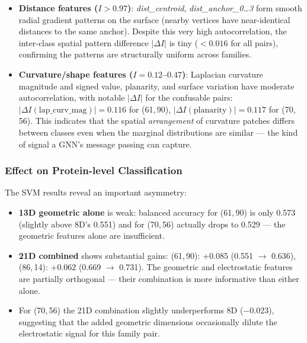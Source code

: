 \begin{itemize}
  \item \textbf{Distance features ($I > 0.97$)}: \textit{dist\_centroid},
        \textit{dist\_anchor\_0\ldots3} form smooth radial gradient patterns
        on the surface (nearby vertices have near-identical distances to the
        same anchor).
        Despite this very high autocorrelation, the inter-class spatial pattern
        difference $|\Delta I|$ is tiny ($< 0.016$ for all pairs), confirming
        the patterns are structurally uniform across families.

  \item \textbf{Curvature/shape features ($I = 0.12$--$0.47$)}: Laplacian
        curvature magnitude and signed value, planarity, and surface variation
        have moderate autocorrelation, with notable $|\Delta I|$ for the
        confusable pairs:
        $|\Delta I(\text{lap\_curv\_mag})| = 0.116$ for (61,\,90),
        $|\Delta I(\text{planarity})| = 0.117$ for (70,\,56).
        This indicates that the spatial \emph{arrangement} of curvature patches
        differs between classes even when the marginal distributions are
        similar --- the kind of signal a GNN's message passing can capture.
\end{itemize}

\subsubsection{Effect on Protein-level Classification}

The SVM results reveal an important asymmetry:
\begin{itemize}
  \item \textbf{13D geometric alone} is weak: balanced accuracy for (61,\,90)
        is only 0.573 (slightly above 8D's 0.551) and for (70,\,56) actually
        drops to 0.529 --- the geometric features alone are insufficient.
  \item \textbf{21D combined} shows substantial gains:
        (61,\,90): $+$0.085 (0.551 $\to$ 0.636),
        (86,\,14): $+$0.062 (0.669 $\to$ 0.731).
        The geometric and electrostatic features are partially orthogonal ---
        their combination is more informative than either alone.
  \item For (70,\,56) the 21D combination slightly underperforms 8D ($-$0.023),
        suggesting that the added geometric dimensions occasionally dilute the
        electrostatic signal for this family pair.
\end{itemize}

